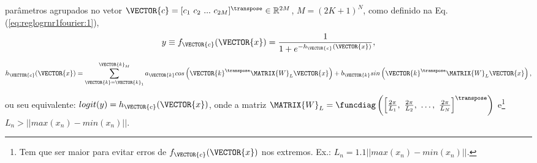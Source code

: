 \begin{theorem}
\begin{minipage}{0.55\textwidth}
parâmetros agrupados no vetor $\VECTOR{c}=[c_1~ c_2~ ...~ c_{2M}]^{\transpose}\in \mathbb{R}^{2 M}$, 
$M={(2 K+1)}^N$,
como definido na Eq. (\ref{eq:reglogrnr1fourier:1}),
\begin{equation}\label{eq:reglogrnr1fourier:1}
y\equiv f_{\VECTOR{c}}(\VECTOR{x})= \frac{1}{1+e^{-h_{\VECTOR{c}}(\VECTOR{x}) }},
\end{equation}
\end{minipage}
\begin{equation}
 h_{\VECTOR{c}}(\VECTOR{x}) = 
\sum_{\VECTOR{k}=\VECTOR{k}_1}^{\VECTOR{k}_M}
a_{\VECTOR{k}} cos\left(\VECTOR{k}^{\transpose}\MATRIX{W}_{L}\VECTOR{x}\right)+
b_{\VECTOR{k}} sin\left(\VECTOR{k}^{\transpose}\MATRIX{W}_{L}\VECTOR{x}\right),
\end{equation}


ou seu equivalente: $logit(y)=h_{\VECTOR{c}}(\VECTOR{x})$, onde a matriz
$\MATRIX{W}_{L}=\funcdiag\left(\left[\frac{2 \pi}{L_1},~\frac{2 \pi}{L_2},~\dots,~\frac{2 \pi}{L_N}\right]^{\transpose}\right)$
e\footnote{Tem 
que ser maior para evitar erros de $f_{\VECTOR{c}}(\VECTOR{x})$ nos extremos. 
Ex.: $L_n =1.1 || max(x_n)-min(x_n)||$.}
 $L_n > || max(x_n)-min(x_n)||$.


\end{theorem}
